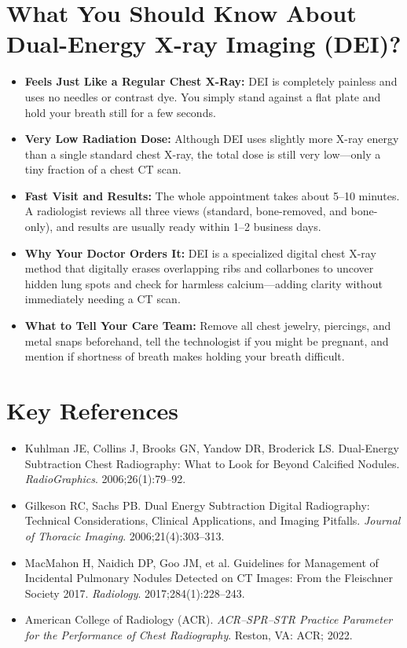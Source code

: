 \section{What You Should Know About Dual-Energy X-ray Imaging (DEI)?}
\begin{itemize}
    \item \textbf{Feels Just Like a Regular Chest X-Ray:} DEI is completely painless and uses no needles or contrast dye. You simply stand against a flat plate and hold your breath still for a few seconds.
    \item \textbf{Very Low Radiation Dose:} Although DEI uses slightly more X-ray energy than a single standard chest X-ray, the total dose is still very low---only a tiny fraction of a chest CT scan.
    \item \textbf{Fast Visit and Results:} The whole appointment takes about 5--10 minutes. A radiologist reviews all three views (standard, bone-removed, and bone-only), and results are usually ready within 1--2 business days.
    \item \textbf{Why Your Doctor Orders It:} DEI is a specialized digital chest X-ray method that digitally erases overlapping ribs and collarbones to uncover hidden lung spots and check for harmless calcium---adding clarity without immediately needing a CT scan.
    \item \textbf{What to Tell Your Care Team:} Remove all chest jewelry, piercings, and metal snaps beforehand, tell the technologist if you might be pregnant, and mention if shortness of breath makes holding your breath difficult.
\end{itemize}

\section{Key References}
\begin{itemize}
    \item Kuhlman JE, Collins J, Brooks GN, Yandow DR, Broderick LS. Dual-Energy Subtraction Chest Radiography: What to Look for Beyond Calcified Nodules. \textit{RadioGraphics}. 2006;26(1):79--92.
    \item Gilkeson RC, Sachs PB. Dual Energy Subtraction Digital Radiography: Technical Considerations, Clinical Applications, and Imaging Pitfalls. \textit{Journal of Thoracic Imaging}. 2006;21(4):303--313.
    \item MacMahon H, Naidich DP, Goo JM, et al. Guidelines for Management of Incidental Pulmonary Nodules Detected on CT Images: From the Fleischner Society 2017. \textit{Radiology}. 2017;284(1):228--243.
    \item American College of Radiology (ACR). \textit{ACR--SPR--STR Practice Parameter for the Performance of Chest Radiography}. Reston, VA: ACR; 2022.
\end{itemize}
